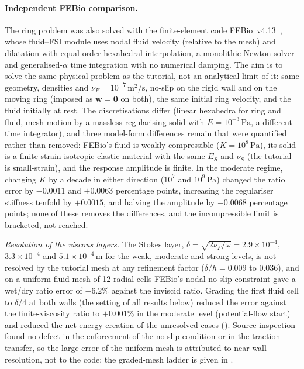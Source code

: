 \paragraph{Independent FEBio comparison.}
The ring problem was also solved with the finite-element code FEBio~v4.13~\citep{Maas2012,Ateshian2018,Shim2019}, whose fluid--FSI module uses nodal fluid velocity (relative to the mesh) and dilatation with equal-order hexahedral interpolation, a monolithic Newton solver and generalised-$\alpha$ time integration with no numerical damping.
The aim is to solve the same physical problem as the tutorial, not an analytical limit of it: same geometry, densities and $\nu_F=10^{-7}\,\mathrm{m^2/s}$, no-slip on the rigid wall and on the moving ring (imposed as $\bm{w}=\bm{0}$ on both), the same initial ring velocity, and the fluid initially at rest.
The discretisations differ (linear hexahedra for ring and fluid, mesh motion by a massless regularising solid with $E=10^{-3}\,\mathrm{Pa}$, a different time integrator), and three model-form differences remain that were quantified rather than removed: FEBio's fluid is weakly compressible ($K=10^{8}\,\mathrm{Pa}$), its solid is a finite-strain isotropic elastic material with the same $E_S$ and $\nu_S$ (the tutorial is small-strain), and the response amplitude is finite.
In the moderate regime, changing $K$ by a decade in either direction ($10^{7}$ and $10^{9}\,\mathrm{Pa}$) changed the ratio error by $-0.0011$ and $+0.0063$ percentage points, increasing the regulariser stiffness tenfold by $+0.0015$, and halving the amplitude by $-0.0068$ percentage points; none of these removes the differences, and the incompressible limit is bracketed, not reached.

\emph{Resolution of the viscous layers.}
The Stokes layer, $\delta=\sqrt{2\nu_F/\omega}=2.9\times10^{-4}$, $3.3\times10^{-4}$ and $5.1\times10^{-4}\,\mathrm{m}$ for the weak, moderate and strong levels, is not resolved by the tutorial mesh at any refinement factor ($\delta/h=0.009$ to $0.036$), and on a uniform fluid mesh of 12 radial cells FEBio's nodal no-slip constraint gave a wet/dry ratio error of $-6.2\%$ against the inviscid ratio.
Grading the first fluid cell to $\delta/4$ at both walls (the setting of all results below) reduced the error against the finite-viscosity ratio to $+0.001\%$ in the moderate level (potential-flow start) and reduced the net energy creation of the unresolved cases (\suppRef).
Source inspection found no defect in the enforcement of the no-slip condition or in the traction transfer, so the large error of the uniform mesh is attributed to near-wall resolution, not to the code; the graded-mesh ladder is given in \suppRef.

